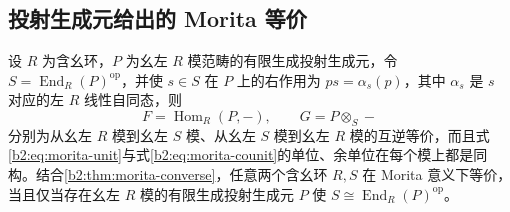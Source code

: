 \subsection{投射生成元给出的 Morita 等价}
\label{b2:subsec:1603:02}

\begin{theorem}[Morita 等价]\label{b2:thm:morita-equivalence}
	设 \(R\) 为含幺环，\(P\) 为幺左 \(R\) 模范畴的有限生成投射生成元，令 \(S=\operatorname{End}_R(P)^{\mathrm{op}}\)，并使 \(s\in S\) 在 \(P\) 上的右作用为 \(ps=\alpha_s(p)\)，其中 \(\alpha_s\) 是 \(s\) 对应的左 \(R\) 线性自同态，则
	\[
		F=\operatorname{Hom}_R(P,-),\qquad G=P\otimes_S-
	\]
	分别为从幺左 \(R\) 模到幺左 \(S\) 模、从幺左 \(S\) 模到幺左 \(R\) 模的互逆等价，而且式\eqref{b2:eq:morita-unit}与式\eqref{b2:eq:morita-counit}的单位、余单位在每个模上都是同构。结合\cref{b2:thm:morita-converse}，任意两个含幺环 \(R,S\) 在 Morita 意义下等价，当且仅当存在幺左 \(R\) 模的有限生成投射生成元 \(P\) 使 \(S\cong\operatorname{End}_R(P)^{\mathrm{op}}\)。
\end{theorem}
